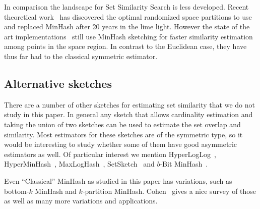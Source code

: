 In comparison the landscape for Set Similarity Search is less developed.
Recent theoretical work~\cite{christiani2017set, DBLP:conf/focs/AhleK20} has discovered the optimal randomized space partitions to use and replaced MinHash after 20 years in the lime light.
However the state of the art implementations~\cite{christiani2018scalable} still use MinHash sketching for faster similarity estimation among points in the space region.
In contrast to the Euclidean case, they have thus far had to the classical symmetric estimator.



\subsection{Alternative sketches}

There are a number of other sketches for estimating set similarity that we do not study in this paper.
In general any sketch that allows cardinality estimation and taking the union of two sketches can be used to estimate the set overlap and similarity.
Most estimators for these sketches are of the symmetric type, so it would be interesting to study whether some of them have good asymmetric estimators as well.
Of particular interest we mention HyperLogLog~\cite{flajolet2007hyperloglog}, HyperMinHash~\cite{yu2020hyperminhash}, MaxLogHash~\cite{wang2019memory}, SetSketch~\cite{DBLP:journals/corr/abs-2101-00314} and $b$-Bit MinHash~\cite{li2010b}.

Even ``Classical'' MinHash as studied in this paper has variations, such as bottom-$k$ MinHash and $k$-partition MinHash. Cohen~\cite{DBLP:reference/algo/Cohen16b} gives a nice survey of those as well as many more variations and applications.


